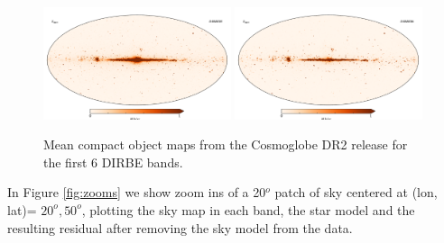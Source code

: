 \documentclass{aa}
\begin{document}
\begin{figure}
  \includegraphics[width=0.49\textwidth]{figs/starmaps/all_stars_mean_05.pdf}
  \includegraphics[width=0.49\textwidth]{figs/starmaps/all_stars_mean_06.pdf} \\
  \caption{Mean compact object maps from the Cosmoglobe DR2 release for the first 6 DIRBE bands. }
  \label{fig:starsT}
\end{figure}

In Figure \ref{fig:zooms} we show zoom ins of a 20$^o$ patch of sky centered at (lon, lat)= $20^o, 50^o$, plotting the sky map in each band, the star model and the resulting residual after removing the sky model from the data.
\end{document}
